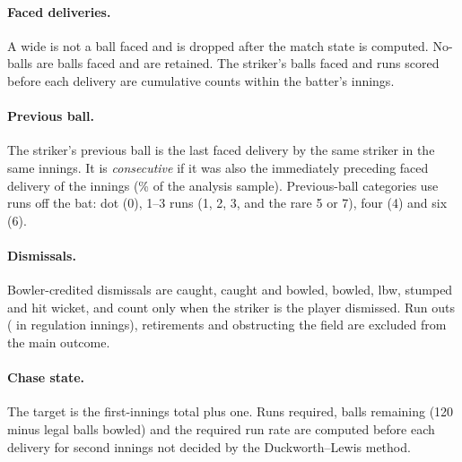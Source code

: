 \documentclass[11pt]{article}
\begin{document}
\paragraph{Faced deliveries.} A wide is not a ball faced and is dropped after the match state is computed. No-balls are balls faced and are retained. The striker's balls faced and runs scored before each delivery are cumulative counts within the batter's innings.

\paragraph{Previous ball.} The striker's previous ball is the last faced delivery by the same striker in the same innings. It is \emph{consecutive} if it was also the immediately preceding faced delivery of the innings (\ConsecutiveShare\% of the analysis sample). Previous-ball categories use runs off the bat: dot (0), 1--3 runs (1, 2, 3, and the rare 5 or 7), four (4) and six (6).

\paragraph{Dismissals.} Bowler-credited dismissals are caught, caught and bowled, bowled, lbw, stumped and hit wicket, and count only when the striker is the player dismissed. Run outs (\RunOuts{} in regulation innings), retirements and obstructing the field are excluded from the main outcome.

\paragraph{Chase state.} The target is the first-innings total plus one. Runs required, balls remaining (120 minus legal balls bowled) and the required run rate are computed before each delivery for second innings not decided by the Duckworth--Lewis method.
\end{document}
